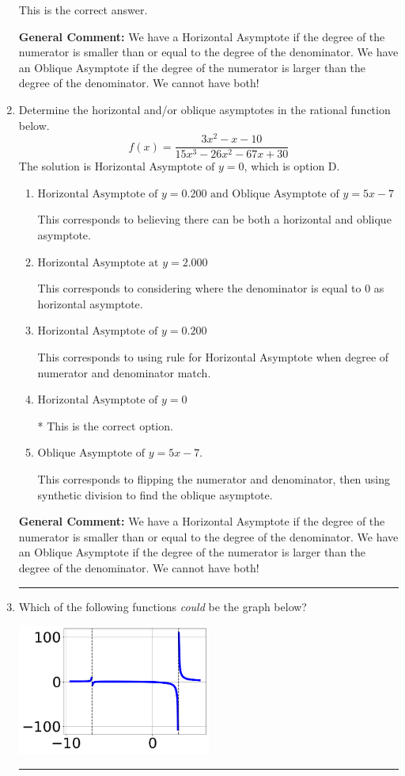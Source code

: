 \documentclass{extbook}[14pt]
\newcommand{\litem}[1]{\item #1

\rule{\textwidth}{0.4pt}}
\begin{document}
\begin{enumerate}
{\begin{enumerate}[label=\Alph*.]
This is the correct answer.
\end{enumerate}

\textbf{General Comment:} We have a Horizontal Asymptote if the degree of the numerator is smaller than or equal to the degree of the denominator. We have an Oblique Asymptote if the degree of the numerator is larger than the degree of the denominator. We cannot have both!
}
\litem{
Determine the horizontal and/or oblique asymptotes in the rational function below.
\[ f(x) = \frac{3x^{2} -x -10}{15x^{3} -26 x^{2} -67 x + 30} \]The solution is \( \text{Horizontal Asymptote of } y = 0 \), which is option D.\begin{enumerate}[label=\Alph*.]
\item \( \text{Horizontal Asymptote of } y = 0.200 \text{ and Oblique Asymptote of } y = 5x -7 \)

This corresponds to believing there can be both a horizontal and oblique asymptote.
\item \( \text{Horizontal Asymptote at } y = 2.000 \)

This corresponds to considering where the denominator is equal to 0 as horizontal asymptote.
\item \( \text{Horizontal Asymptote of } y = 0.200  \)

This corresponds to using rule for Horizontal Asymptote when degree of numerator and denominator match.
\item \( \text{Horizontal Asymptote of } y = 0 \)

* This is the correct option.
\item \( \text{Oblique Asymptote of } y = 5x -7. \)

This corresponds to flipping the numerator and denominator, then using synthetic division to find the oblique asymptote.
\end{enumerate}

\textbf{General Comment:} We have a Horizontal Asymptote if the degree of the numerator is smaller than or equal to the degree of the denominator. We have an Oblique Asymptote if the degree of the numerator is larger than the degree of the denominator. We cannot have both!
}
\litem{
Which of the following functions \textit{could} be the graph below?

\begin{center}
    \includegraphics[width=0.5\textwidth]{../Figures/identifyGraphOfRationalFunctionA.png}
\end{center}


}
\end{enumerate}
\end{document}
